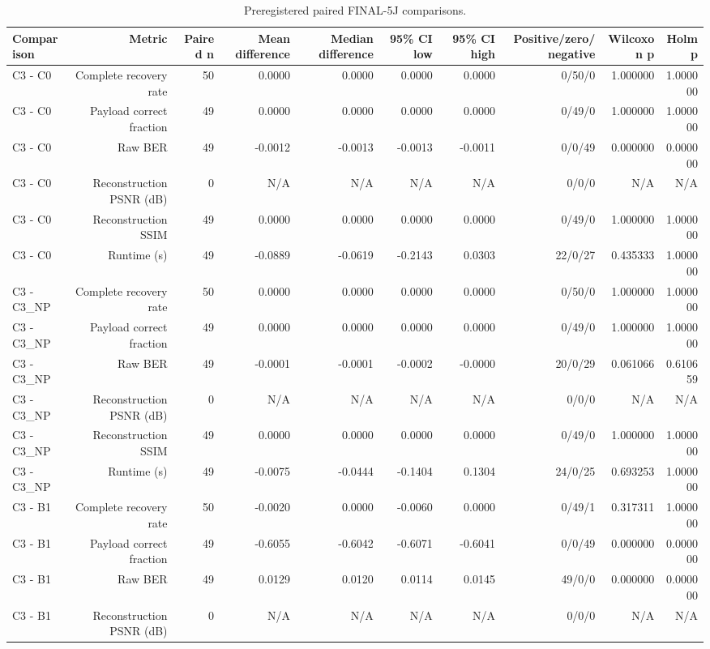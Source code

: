 \begin{table}[htbp]
\centering
\caption{Preregistered paired FINAL-5J comparisons.}
\label{tab:5j-primary-comparisons}
\begin{tabular}{lrrrrrrrrr}
\toprule
Comparison & Metric & Paired n & Mean difference & Median difference & 95\% CI low & 95\% CI high & Positive/zero/negative & Wilcoxon p & Holm p \\
\midrule
C3 - C0 & Complete recovery rate & 50 & 0.0000 & 0.0000 & 0.0000 & 0.0000 & 0/50/0 & 1.000000 & 1.000000 \\
C3 - C0 & Payload correct fraction & 49 & 0.0000 & 0.0000 & 0.0000 & 0.0000 & 0/49/0 & 1.000000 & 1.000000 \\
C3 - C0 & Raw BER & 49 & -0.0012 & -0.0013 & -0.0013 & -0.0011 & 0/0/49 & 0.000000 & 0.000000 \\
C3 - C0 & Reconstruction PSNR (dB) & 0 & N/A & N/A & N/A & N/A & 0/0/0 & N/A & N/A \\
C3 - C0 & Reconstruction SSIM & 49 & 0.0000 & 0.0000 & 0.0000 & 0.0000 & 0/49/0 & 1.000000 & 1.000000 \\
C3 - C0 & Runtime (s) & 49 & -0.0889 & -0.0619 & -0.2143 & 0.0303 & 22/0/27 & 0.435333 & 1.000000 \\
C3 - C3\_NP & Complete recovery rate & 50 & 0.0000 & 0.0000 & 0.0000 & 0.0000 & 0/50/0 & 1.000000 & 1.000000 \\
C3 - C3\_NP & Payload correct fraction & 49 & 0.0000 & 0.0000 & 0.0000 & 0.0000 & 0/49/0 & 1.000000 & 1.000000 \\
C3 - C3\_NP & Raw BER & 49 & -0.0001 & -0.0001 & -0.0002 & -0.0000 & 20/0/29 & 0.061066 & 0.610659 \\
C3 - C3\_NP & Reconstruction PSNR (dB) & 0 & N/A & N/A & N/A & N/A & 0/0/0 & N/A & N/A \\
C3 - C3\_NP & Reconstruction SSIM & 49 & 0.0000 & 0.0000 & 0.0000 & 0.0000 & 0/49/0 & 1.000000 & 1.000000 \\
C3 - C3\_NP & Runtime (s) & 49 & -0.0075 & -0.0444 & -0.1404 & 0.1304 & 24/0/25 & 0.693253 & 1.000000 \\
C3 - B1 & Complete recovery rate & 50 & -0.0020 & 0.0000 & -0.0060 & 0.0000 & 0/49/1 & 0.317311 & 1.000000 \\
C3 - B1 & Payload correct fraction & 49 & -0.6055 & -0.6042 & -0.6071 & -0.6041 & 0/0/49 & 0.000000 & 0.000000 \\
C3 - B1 & Raw BER & 49 & 0.0129 & 0.0120 & 0.0114 & 0.0145 & 49/0/0 & 0.000000 & 0.000000 \\
C3 - B1 & Reconstruction PSNR (dB) & 0 & N/A & N/A & N/A & N/A & 0/0/0 & N/A & N/A \\

\end{tabular}
\end{table}
